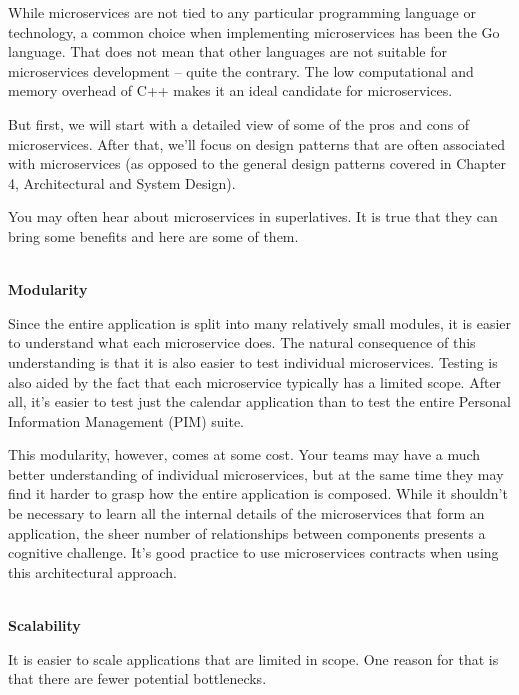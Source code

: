 

While microservices are not tied to any particular programming language or technology, a common choice when implementing microservices has been the Go language. That does not mean that other languages are not suitable for microservices development – quite the contrary. The low computational and memory overhead of C++ makes it an ideal candidate for microservices. 

But first, we will start with a detailed view of some of the pros and cons of microservices. After that, we'll focus on design patterns that are often associated with microservices (as opposed to the general design patterns covered in Chapter 4, Architectural and System Design).


You may often hear about microservices in superlatives. It is true that they can bring some benefits and here are some of them.

\hspace*{\fill} \\ %
\noindent
\textbf{Modularity}

Since the entire application is split into many relatively small modules, it is easier to understand what each microservice does. The natural consequence of this understanding is that it is also easier to test individual microservices. Testing is also aided by the fact that each microservice typically has a limited scope. After all, it's easier to test just the calendar application than to test the entire Personal Information Management (PIM) suite.

This modularity, however, comes at some cost. Your teams may have a much better understanding of individual microservices, but at the same time they may find it harder to grasp how the entire application is composed. While it shouldn't be necessary to learn all the internal details of the microservices that form an application, the sheer number of relationships between components presents a cognitive challenge. It's good practice to use microservices contracts when using this architectural  approach.

\hspace*{\fill} \\ %
\noindent
\textbf{Scalability}

It is easier to scale applications that are limited in scope. One reason for that is that there are fewer potential bottlenecks.

